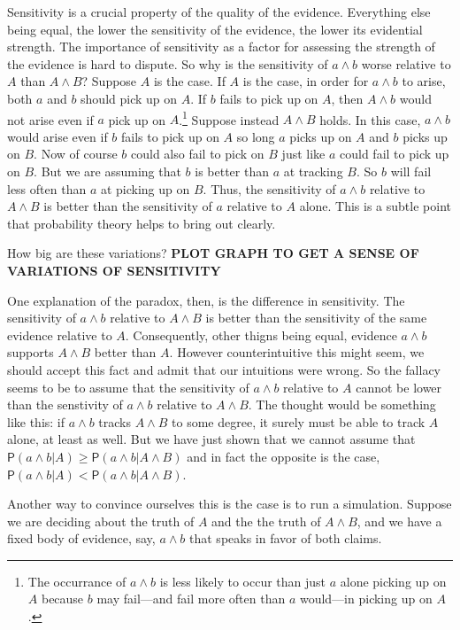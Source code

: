 \documentclass[10pt,dvipsnames,enabledeprecatedfontcommands]{scrartcl}
\newcommand{\pr}[1]{\mathsf{P}(#1)}
\begin{document}
Sensitivity is a crucial property of the quality of the evidence.
Everything else being equal, the lower the sensitivity of the evidence,
the lower its evidential strength. The importance of sensitivity as a
factor for assessing the strength of the evidence is hard to dispute. So
why is the sensitivity of \(a\wedge b\) worse relative to \(A\) than
\(A \wedge B\)? Suppose \(A\) is the case. If \(A\) is the case, in
order for \(a\wedge b\) to arise, both \(a\) and \(b\) should pick up on
\(A\). If \(b\) fails to pick up on \(A\), then \(A \wedge b\) would not
arise even if \(a\) pick up on
\(A\).\footnote{The occurrance of $a\wedge b$ is less likely to occur than just $a$ alone picking up on $A$ because $b$ may fail---and fail more often than $a$ would---in picking up on $A$.}
Suppose instead \(A\wedge B\) holds. In this case, \(a\wedge b\) would
arise even if \(b\) fails to pick up on \(A\) so long \(a\) picks up on
\(A\) and \(b\) picks up on \(B\). Now of course \(b\) could also fail
to pick on \(B\) just like \(a\) could fail to pick up on \(B\). But we
are assuming that \(b\) is better than \(a\) at tracking \(B\). So \(b\)
will fail less often than \(a\) at picking up on \(B\). Thus, the
sensitivity of \(a\wedge b\) relative to \(A\wedge B\) is better than
the sensitivity of \(a\) relative to \(A\) alone. This is a subtle point
that probability theory helps to bring out clearly.

How big are these variations?
\textbf{PLOT GRAPH TO GET A SENSE OF VARIATIONS OF SENSITIVITY}

One explanation of the paradox, then, is the difference in sensitivity.
The sensitivity of \(a\wedge b\) relative to \(A\wedge B\) is better
than the sensitivity of the same evidence relative to \(A\).
Consequently, other thigns being equal, evidence \(a\wedge b\) supports
\(A\wedge B\) better than \(A\). However counterintuitive this might
seem, we should accept this fact and admit that our intuitions were
wrong. So the fallacy seems to be to assume that the sensitivity of
\(a\wedge b\) relative to \(A\) cannot be lower than the senstivity of
\(a\wedge b\) relative to \(A\wedge B\). The thought would be something
like this: if \(a \wedge b\) tracks \(A\wedge B\) to some degree, it
surely must be able to track \(A\) alone, at least as well. But we have
just shown that we cannot assume that
\(\pr{a\wedge b \vert A} \geq \pr{a\wedge b \vert A\wedge B}\) and in
fact the opposite is the case,
\(\pr{a\wedge b \vert A} < \pr{a\wedge b \vert A\wedge B}\).

Another way to convince ourselves this is the case is to run a
simulation. Suppose we are deciding about the truth of \(A\) and the the
truth of \(A\wedge B\), and we have a fixed body of evidence, say,
\(a\wedge b\) that speaks in favor of both claims.
\end{document}

